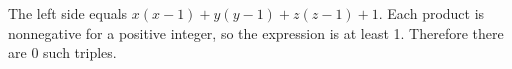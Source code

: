 The left side equals $x(x-1)+y(y-1)+z(z-1)+1$. Each product is nonnegative for a positive integer, so the expression is at least 1. Therefore there are $\boxed{0}$ such triples.
